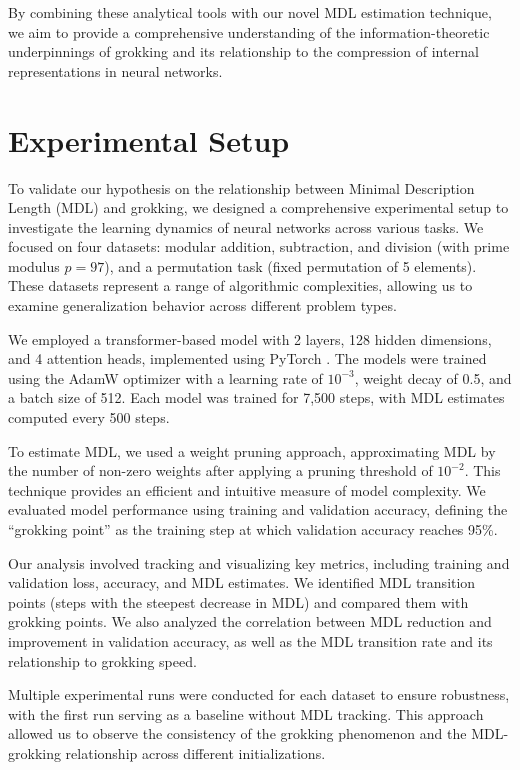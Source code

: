 \documentclass{article} %
\begin{document}
By combining these analytical tools with our novel MDL estimation technique, we aim to provide a comprehensive understanding of the information-theoretic underpinnings of grokking and its relationship to the compression of internal representations in neural networks.

\section{Experimental Setup}
\label{sec:experimental}

To validate our hypothesis on the relationship between Minimal Description Length (MDL) and grokking, we designed a comprehensive experimental setup to investigate the learning dynamics of neural networks across various tasks. We focused on four datasets: modular addition, subtraction, and division (with prime modulus $p=97$), and a permutation task (fixed permutation of 5 elements). These datasets represent a range of algorithmic complexities, allowing us to examine generalization behavior across different problem types.

We employed a transformer-based model \cite{vaswani2017attention} with 2 layers, 128 hidden dimensions, and 4 attention heads, implemented using PyTorch \cite{paszke2019pytorch}. The models were trained using the AdamW optimizer \cite{loshchilov2017adamw} with a learning rate of $10^{-3}$, weight decay of 0.5, and a batch size of 512. Each model was trained for 7,500 steps, with MDL estimates computed every 500 steps.

To estimate MDL, we used a weight pruning approach, approximating MDL by the number of non-zero weights after applying a pruning threshold of $10^{-2}$. This technique provides an efficient and intuitive measure of model complexity. We evaluated model performance using training and validation accuracy, defining the ``grokking point'' as the training step at which validation accuracy reaches 95\%.

Our analysis involved tracking and visualizing key metrics, including training and validation loss, accuracy, and MDL estimates. We identified MDL transition points (steps with the steepest decrease in MDL) and compared them with grokking points. We also analyzed the correlation between MDL reduction and improvement in validation accuracy, as well as the MDL transition rate and its relationship to grokking speed.

Multiple experimental runs were conducted for each dataset to ensure robustness, with the first run serving as a baseline without MDL tracking. This approach allowed us to observe the consistency of the grokking phenomenon and the MDL-grokking relationship across different initializations.
\end{document}

